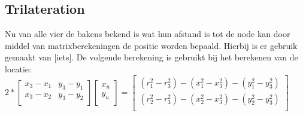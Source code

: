 \documentclass{article}
\begin{document}
\subsection{Trilateration}
Nu van alle vier de bakens bekend is wat hun afstand is tot de node kan door middel van matrixberekeningen de positie worden bepaald. Hierbij is er gebruik gemaakt van [iets]. 
De volgende berekening is gebruikt bij het berekenen van de locatie: \newline
$2*\begin{bmatrix}
       x_3 - x_1 & y_3 - y_1 \\
       x_3 - x_2 & y_3 - y_2 \\          
                
     \end{bmatrix}
     \begin{bmatrix}
       x_u \\          
       y_u \\         
     \end{bmatrix}
=\begin{bmatrix}
       (r_1^2 - r_3^2) - (x_1^2 - x_3^2) - (y_1^2 - y_3^2) \\
       (r_2^2 - r_3^2) - (x_2^2 - x_3^2) - (y_2^2 - y_3^2) \\
     \end{bmatrix}$     
\newline
\end{document}
